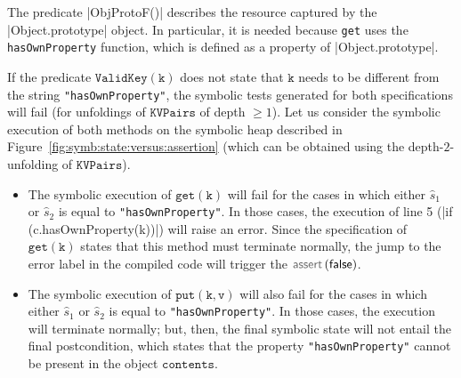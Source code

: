 \vspace{10pt}
The predicate \jsinline|ObjProtoF()| describes the resource captured by the \jsinline|Object.prototype| object. 
In particular, it is needed because \texttt{get} uses the \texttt{hasOwnProperty} function, which is 
defined as a property of \jsinline|Object.prototype|.

If the predicate  $\mathtt{ValidKey(k)}$ does not state that  $\mathtt{k}$ needs to be different 
from the string \texttt{"hasOwnProperty"}, the symbolic tests generated for both specifications 
will fail (for unfoldings of $\mathtt{KVPairs}$ of depth $\geq 1$). 
Let us consider the symbolic execution of both methods on the symbolic heap described 
in Figure~\ref{fig:symb:state:versus:assertion} (which can be obtained using the depth-$2$-unfolding 
of $\mathtt{KVPairs}$). 
\begin{itemize}
 \item {} The symbolic execution of  $\mathtt{get(k)}$ will fail for the cases 
           in which either $\hat{s}_1$ or $\hat{s}_2$ is equal to \texttt{"hasOwnProperty"}. In those 
           cases, the execution of line 5 (\jsinline|if (c.hasOwnProperty(k))|) will raise an error. 
           Since the specification of  $\mathtt{get(k)}$ states that this method must terminate 
           normally, the jump to the error label in the compiled \jsil code will trigger the $\assert(\jfalse)$. 

 \item {} The symbolic execution of  $\mathtt{put(k, v)}$ will also fail for the cases 
           in which either $\hat{s}_1$ or $\hat{s}_2$ is equal to \texttt{"hasOwnProperty"}. In those 
           cases, the execution will terminate normally; but, then,  the final symbolic 
           state will not entail the final postcondition, which states that the property 
            \texttt{"hasOwnProperty"} cannot be present in the object $\mathtt{contents}$. 
\end{itemize}



